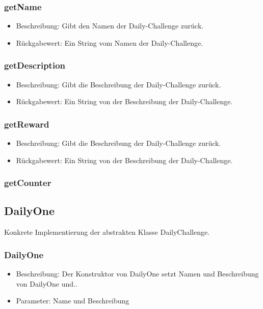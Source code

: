 \documentclass[a4paper]{scrreprt}
\begin{document}
   \subsubsection{getName}
   \begin{itemize}
     \item Beschreibung: Gibt den Namen der Daily-Challenge zurück.
     \item Rückgabewert: Ein String vom Namen der Daily-Challenge.
    \end{itemize}
   \subsubsection{getDescription}
   \begin{itemize}
     \item Beschreibung: Gibt die Beschreibung der Daily-Challenge zurück.
     \item Rückgabewert: Ein String von der Beschreibung der Daily-Challenge.
    \end{itemize}
   \subsubsection{getReward}
   \begin{itemize}
   \item Beschreibung: Gibt die Beschreibung der Daily-Challenge zurück.
   \item Rückgabewert: Ein String von der Beschreibung der Daily-Challenge.
   \end{itemize}
   \subsubsection{getCounter}
   
   \subsection{DailyOne}
   Konkrete Implementierung der abstrakten Klasse DailyChallenge.
   \subsubsection{DailyOne}
   \begin{itemize}
   	\item Beschreibung: Der Konstruktor von DailyOne setzt Namen und Beschreibung von DailyOne und..
   	\item Parameter: Name und Beschreibung 
   \end{itemize}
\end{document}
